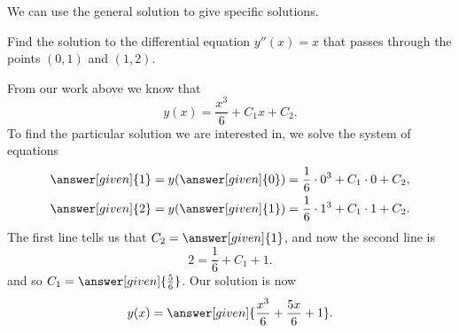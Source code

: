 \documentclass{ximera}
\begin{document}
We can use the general solution to give specific solutions.

\begin{example}
  Find the solution to the differential equation $y''(x) = x$ that
  passes through the points $(0,1)$ and $(1,2)$.
  \begin{explanation}
    From our work above we know that
    \[
    y(x) = \frac{x^3}{6}+C_1x+C_2.
    \]
    To find the particular solution we are interested in, we solve the
    system of equations
    \begin{align*}
      \answer[given]{1}= y(\answer[given]{0}) &= \frac{1}{6}\cdot 0^3+C_1\cdot 0+C_2,\\
      \answer[given]{2}= y(\answer[given]{1}) &= \frac{1}{6}\cdot 1^3+C_1\cdot 1+C_2.
    \end{align*}
    The first line tells us that $C_2 = \answer[given]{1}$, and now the second line is
    \[
    2= \frac{1}{6}+C_1+1.
    \]
    and so $C_1 = \answer[given]{\frac{5}{6}}$. Our solution is now
    \[
    y(x) = \answer[given]{\frac{x^3}{6}+\frac{5 x}{6}+1}.
    \]
  \end{explanation}
\end{example}
\end{document}
